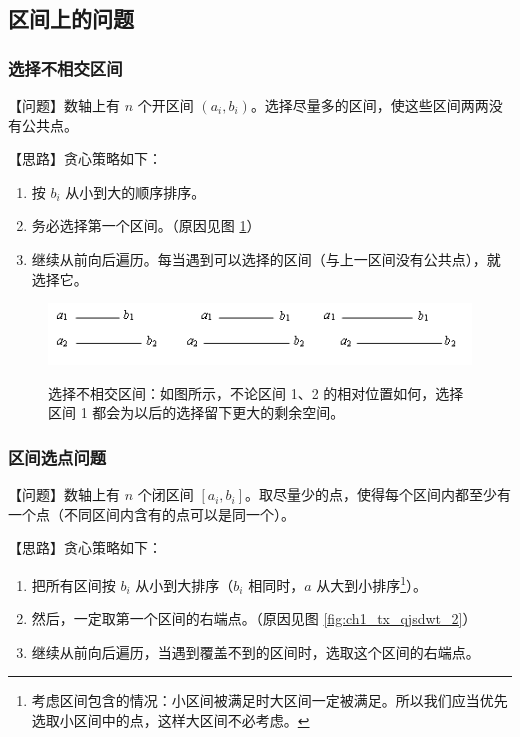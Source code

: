 \subsection{区间上的问题}

\subsubsection{选择不相交区间}
	【问题】数轴上有 $n$ 个开区间  $(a_i,b_i)$。选择尽量多的区间，使这些区间两两没有公共点。
	
	【思路】贪心策略如下：
	
	\begin{enumerate}
		\item 按 $b_i$ 从小到大的顺序排序。
		\item 务必选择第一个区间。（原因见图 \ref{fig:ch1_tx_qjsdwt_1}）
		\item 继续从前向后遍历。每当遇到可以选择的区间（与上一区间没有公共点），就选择它。
	\end{enumerate}
	
	\begin{figure}[htb]
		\centering
		\includegraphics{ch1/figures/选择不相交区间.png}
		\label{fig:ch1_tx_qjsdwt_1}
		\caption{选择不相交区间：如图所示，不论区间 1、2 的相对位置如何，选择区间 1 都会为以后的选择留下更大的剩余空间。}
	\end{figure}

\subsubsection{区间选点问题}
	【问题】数轴上有 $n$ 个闭区间 $[a_i, b_i]$。取尽量少的点，使得每个区间内都至少有一个点（不同区间内含有的点可以是同一个）。
	
	【思路】贪心策略如下：
	
	\begin{enumerate}
		\item 把所有区间按 $b_i$ 从小到大排序（$b_i$ 相同时，$a$ 从大到小排序\footnote{考虑区间包含的情况：小区间被满足时大区间一定被满足。所以我们应当优先选取小区间中的点，这样大区间不必考虑。}）。
		\item 然后，一定取第一个区间的右端点。（原因见图 \ref{fig:ch1_tx_qjsdwt_2}）
		\item 继续从前向后遍历，当遇到覆盖不到的区间时，选取这个区间的右端点。
	\end{enumerate}
	
